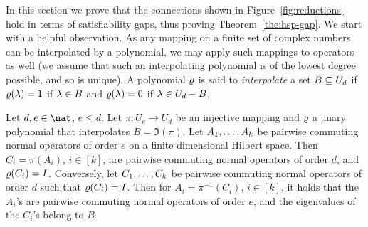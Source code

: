 In this section we prove that the connections shown in
Figure~\ref{fig:reductions} hold in terms of satisfiability gaps, thus proving
Theorem~\ref{the:hsp-gap}. We start with a helpful observation. As any mapping on a finite set of complex numbers can be interpolated by a polynomial, we may apply such mappings to operators as well (we assume that such an interpolating polynomial is of the lowest degree possible, and so is unique). A polynomial $\varrho$ is said to \emph{interpolate} a set $B\subseteq U_d$ if $\varrho(\lambda)=1$ if $\lambda\in B$ and $\varrho(\lambda)=0$ if $\lambda\in U_d-B$.

\begin{lemma}\label{lem:mapping}
Let $d,e\in\nat$, $e\le d$. 
Let $\pi:U_e\to U_d$ be an injective mapping and $\varrho$ a unary polynomial that interpolates $B=\Im(\pi)$.  Let $A _1,\ldots, A _{k}$ be pairwise commuting normal operators of order $e$ on a finite dimensional Hilbert space. Then $C_i=\pi(A_i)$, $i\in[k]$, are pairwise commuting normal operators of order $d$, and $\varrho(C_i)=I$. Conversely, let $C _1,\ldots, C _{k}$ be pairwise commuting normal operators of order $d$ such that $\varrho(C_i)=I$. Then for $A_i=\pi^{-1}(C_i)$, $i\in[k]$, it holds that the $A_i$'s are pairwise commuting normal operators of order $e$, and the eigenvalues of the $C_i$'s belong to $B$.
\end{lemma}

